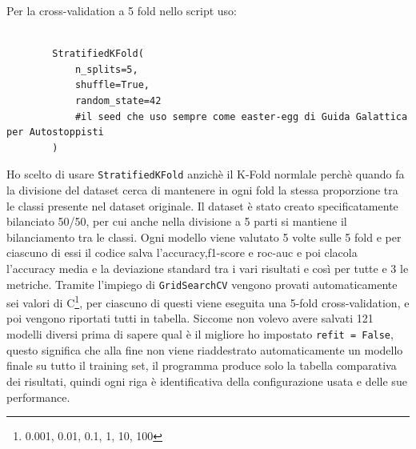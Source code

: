 \documentclass[a4paper,12pt]{report}
\begin{document}
    Per la cross-validation a 5 fold nello script uso: 
    \begin{lstlisting}[style=rulednumbered, language=python*, gobble=4]

        StratifiedKFold(
            n_splits=5,
            shuffle=True,
            random_state=42
            #il seed che uso sempre come easter-egg di Guida Galattica per Autostoppisti
        )
    \end{lstlisting} 
    Ho scelto di usare \texttt{StratifiedKFold} anzichè il K-Fold normlale perchè quando fa la divisione del dataset cerca di mantenere in ogni fold la stessa proporzione tra le classi presente nel dataset originale. Il dataset è stato creato specificatamente bilanciato 50/50, per cui anche nella divisione a 5 parti si mantiene il bilanciamento tra le classi. 
    Ogni modello viene valutato 5 volte sulle 5 fold e per ciascuno di essi il codice salva l'accuracy,f1-score e roc-auc e poi clacola l'accuracy media e la deviazione standard tra i vari risultati e così per tutte e 3 le metriche. Tramite l'impiego di \texttt{GridSearchCV} vengono provati automaticamente sei valori di C\footnote{0.001, 0.01, 0.1, 1, 10, 100}, per ciascuno di questi viene eseguita una 5-fold cross-validation, e poi vengono riportati tutti in tabella. Siccome non volevo avere salvati 121 modelli diversi prima di sapere qual è il migliore ho impostato \texttt{refit = False}, questo significa che alla fine non viene riaddestrato automaticamente un modello finale su tutto il training set, il programma produce solo la tabella comparativa dei risultati, quindi ogni riga è identificativa della configurazione usata e delle sue performance. 
\end{document}
